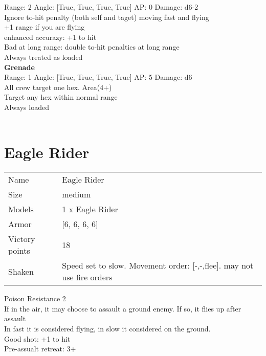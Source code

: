 Range: 2  Angle: [True, True, True, True] AP: 0 Damage: d6-2 \\
Ignore to-hit penalty (both self and taget) moving fast and flying\\ 
+1 range if you are flying\\ 
enhanced accurazy: +1 to hit\\ 
Bad at long range: double to-hit penalties at long range\\ 
Always treated as loaded\\ 




{\bf Grenade } \\



Range: 1  Angle: [True, True, True, True] AP: 5 Damage: d6 \\
All crew target one hex. Area(4+)\\ 
Target any hex within normal range\\ 
Always loaded\\ 




 
\ \\














\pagebreak\clearpage

\section{ Eagle Rider }

\begin{tabular}{ll}
  Name & Eagle Rider \\
  Size & medium\\
  Models & 1 x Eagle Rider\\
  Armor & [6, 6, 6, 6]\\
  Victory points & 18\\
  Shaken & Speed set to slow. Movement order: [-,-,flee]. may not use fire orders\\
\end{tabular}

Poison Resistance 2\\ 
If in the air, it may choose to assault a ground enemy. If so, it flies up after assault\\ 
In fast it is considered flying, in slow it considered on the ground.\\ 
Good shot: +1 to hit\\ 
Pre-assualt retreat: 3+\\ 



